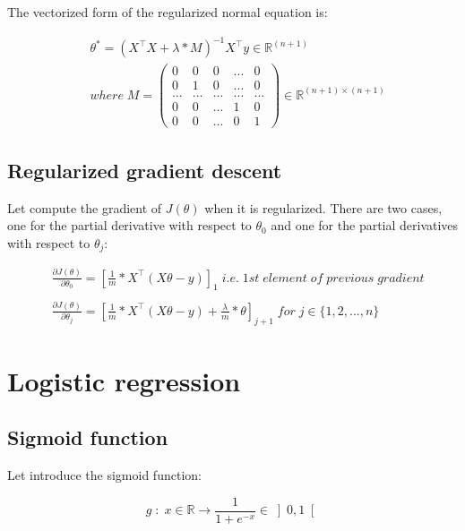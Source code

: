 \documentclass[a4paper, 12pt]{article}
\begin{document}
The vectorized form of the regularized normal equation is:

\begin{align*}
& \theta^* = {(X^{\top}X + \lambda*M)}^{-1}X^{\top}y \in \mathbb{R}^{(n+1)} \\
& where \; M = \begin{pmatrix}0 & 0 & 0 & ... & 0 \\ 0 & 1 & 0 & ... & 0 \\ ... & ... & ... & ... & ... \\ 0 & 0 & ... & 1 & 0 \\ 0 & 0 & ... & 0 & 1\end{pmatrix} \in \mathbb{R}^{(n+1)\times(n+1)}
\end{align*}

\subsection{Regularized gradient descent}

Let compute the gradient of $J(\theta)$ when it is regularized. There are two cases, one for the partial derivative with respect to $\theta_0$ and one for the partial derivatives with respect to $\theta_j$:

\begin{align*}
& \frac{\partial J(\theta)}{\partial \theta_0} = {\left[ \frac{1}{m}*X^{\top}(X\theta-y) \right]}_{1} \; i.e. \; 1st \; element \; of \; previous \; gradient \\
& \\
& \frac{\partial J(\theta)}{\partial \theta_j} = {\left[ \frac{1}{m}*X^{\top}(X\theta-y) + \frac{\lambda}{m} * \theta \right]}_{j+1} \; for \; j \in \{1, 2, ..., n\} 
\end{align*}

\section{Logistic regression}

\subsection{Sigmoid function}

Let introduce the sigmoid function:

\begin{equation}
g \; : \; x \in \mathbb{R} \longrightarrow  \frac{1}{1+e^{-x}} \in \left] 0, 1 \right[
\end{equation}
\end{document}
